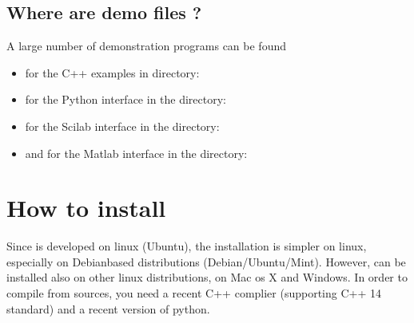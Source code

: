 \documentclass[a4paper,11pt,english]{sphinxmanual}
\begin{document}
\section{Where are demo files ?}
\label{\detokenize{tutorial/intro:where-are-demo-files}}
\sphinxAtStartPar
A large number of demonstration programs can be found
\begin{itemize}
\item {} 
\sphinxAtStartPar
for the C++ examples in directory:

\begin{sphinxVerbatim}[commandchars=\\\{\}]
\end{sphinxVerbatim}

\item {} 
\sphinxAtStartPar
for the Python interface in the directory:

\begin{sphinxVerbatim}[commandchars=\\\{\}]
\end{sphinxVerbatim}

\item {} 
\sphinxAtStartPar
for the Scilab interface in the directory:

\begin{sphinxVerbatim}[commandchars=\\\{\}]
\end{sphinxVerbatim}

\item {} 
\sphinxAtStartPar
and for the Matlab interface in the directory:

\begin{sphinxVerbatim}[commandchars=\\\{\}]
\end{sphinxVerbatim}

\end{itemize}


\chapter{How to install}
\label{\detokenize{tutorial/install:how-to-install}}\label{\detokenize{tutorial/install:ud-install-tut}}\label{\detokenize{tutorial/install::doc}}
\sphinxAtStartPar
Since  is developed on linux (Ubuntu), the installation is simpler on linux, especially on Debian\sphinxhyphen{}based distributions (Debian/Ubuntu/Mint). However,  can be installed also on other linux distributions, on Mac os X and Windows. In order to compile  from sources, you need a recent C++ complier (supporting C++ 14 standard) and a recent version of python.
\end{document}
